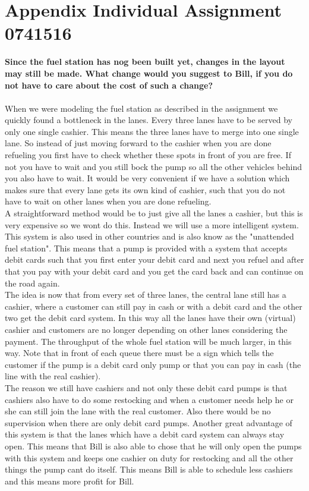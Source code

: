 \section{Appendix Individual Assignment 0741516}\label{app:indivjasper}
\textbf{Since the fuel station has nog been built yet, changes in the layout may still be made. What change would you suggest to Bill, if you do not have to care about the cost of such a change?}\\
\\
When we were modeling the fuel station as described in the assignment we quickly found a bottleneck in the lanes. Every three lanes have to be served by only one single cashier. This means the three lanes have to merge into one single lane. So instead of just moving forward to the cashier when you are done refueling you first have to check whether these spots in front of you are free. If not you have to wait and you still bock the pump so all the other vehicles behind you also have to wait. It would be very convenient if we have a solution which makes sure that every lane gets its own kind of cashier, such that you do not have to wait on other lanes when you are done refueling.\\
A straightforward method would be to just give all the lanes a cashier, but this is very expensive so we wont do this. Instead we will use a more intelligent system. This system is also used in other countries and is also know as the "unattended fuel station". This means that a pump is provided with a system that accepts debit cards such that you first enter your debit card and next you refuel and after that you pay with your debit card and you get the card back and can continue on the road again. \\
The idea is now that from every set of three lanes, the central lane still has a cashier, where a customer can still pay in cash or with a debit card and the other two get the debit card system. In this way all the lanes have their own (virtual) cashier and customers are no longer depending on other lanes considering the payment. The throughput of the whole fuel station will be much larger, in this way. Note that in front of each queue there must be a sign which tells the customer if the pump is a debit card only pump or that you can pay in cash (the line with the real cashier).\\
The reason we still have cashiers and not only these debit card pumps is that cashiers also have to do some restocking and when a customer needs help he or she can still join the lane with the real customer. Also there would be no supervision when there are only debit card pumps. Another great advantage of this system is that the lanes which have a debit card system can always stay open. This means that Bill is also able to chose that he will only open the pumps with this system and keeps one cashier on duty for restocking and all the other things the pump cant do itself. This means Bill is able to schedule less cashiers and this means more profit for Bill.
